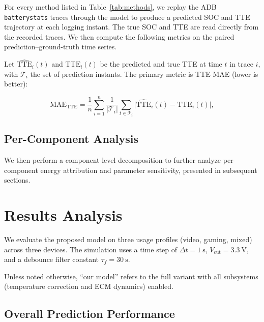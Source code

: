 \documentclass[conference]{IEEEtran}
\begin{document}
For every method listed in Table~\ref{tab:methods}, we replay the ADB \texttt{batterystats} traces through the model to produce a predicted SOC and TTE trajectory at each logging instant. The true SOC and TTE are read directly from the recorded traces. We then compute the following metrics on the paired prediction--ground-truth time series.

Let $\widehat{\mathrm{TTE}}_i(t)$ and $\mathrm{TTE}_i(t)$ be the predicted and true TTE at time $t$ in trace $i$, with $\mathcal{T}_i$ the set of prediction instants. The primary metric is TTE MAE (lower is better):

\begin{equation}
    \mathrm{MAE}_{\mathrm{TTE}} = \frac{1}{n}\sum_{i=1}^{n} \frac{1}{|\mathcal{T}_i|}\sum_{t \in \mathcal{T}_i} \bigl|\widehat{\mathrm{TTE}}_{i}(t) - \mathrm{TTE}_{i}(t)\bigr|,
    \label{eq:mae_tte}
\end{equation}

\subsection{Per-Component Analysis}

We then perform a component-level decomposition to further analyze per-component energy attribution and parameter sensitivity, presented in subsequent sections.





\section{Results Analysis}
\label{sec:results}

We evaluate the proposed model on three usage profiles (video, gaming, mixed) across three devices. The simulation uses a time step of $\Delta t = \SI{1}{\second}$, $V_{\mathrm{cut}} = \SI{3.3}{\volt}$, and a debounce filter constant $\tau_f = \SI{30}{\second}$. 

{\footnotesize Unless noted otherwise, ``our model'' refers to the full variant with all subsystems (temperature correction and ECM dynamics) enabled.}

\subsection{Overall Prediction Performance}
\end{document}
